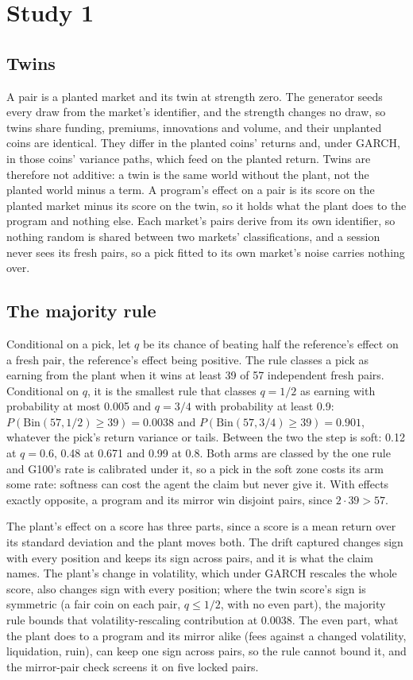 \documentclass[11pt]{article}
\begin{document}
\section{Study 1}\label{app:study1}

\subsection{Twins}

A pair is a planted market and its twin at strength zero. The generator seeds every draw from the market's identifier, and the strength changes no draw, so twins share funding, premiums, innovations and volume, and their unplanted coins are identical. They differ in the planted coins' returns and, under GARCH, in those coins' variance paths, which feed on the planted return. Twins are therefore not additive: a twin is the same world without the plant, not the planted world minus a term. A program's effect on a pair is its score on the planted market minus its score on the twin, so it holds what the plant does to the program and nothing else. Each market's pairs derive from its own identifier, so nothing random is shared between two markets' classifications, and a session never sees its fresh pairs, so a pick fitted to its own market's noise carries nothing over.

\subsection{The majority rule}

Conditional on a pick, let $q$ be its chance of beating half the reference's effect on a fresh pair, the reference's effect being positive. The rule classes a pick as earning from the plant when it wins at least 39 of 57 independent fresh pairs. Conditional on $q$, it is the smallest rule that classes $q=1/2$ as earning with probability at most 0.005 and $q=3/4$ with probability at least 0.9: $P(\mathrm{Bin}(57,1/2)\ge39)=0.0038$ and $P(\mathrm{Bin}(57,3/4)\ge39)=0.901$, whatever the pick's return variance or tails. Between the two the step is soft: 0.12 at $q=0.6$, 0.48 at 0.671 and 0.99 at 0.8. Both arms are classed by the one rule and G100's rate is calibrated under it, so a pick in the soft zone costs its arm some rate: softness can cost the agent the claim but never give it. With effects exactly opposite, a program and its mirror win disjoint pairs, since $2\cdot39>57$.

The plant's effect on a score has three parts, since a score is a mean return over its standard deviation and the plant moves both. The drift captured changes sign with every position and keeps its sign across pairs, and it is what the claim names. The plant's change in volatility, which under GARCH rescales the whole score, also changes sign with every position; where the twin score's sign is symmetric (a fair coin on each pair, $q\le1/2$, with no even part), the majority rule bounds that volatility-rescaling contribution at 0.0038. The even part, what the plant does to a program and its mirror alike (fees against a changed volatility, liquidation, ruin), can keep one sign across pairs, so the rule cannot bound it, and the mirror-pair check screens it on five locked pairs.
\end{document}
